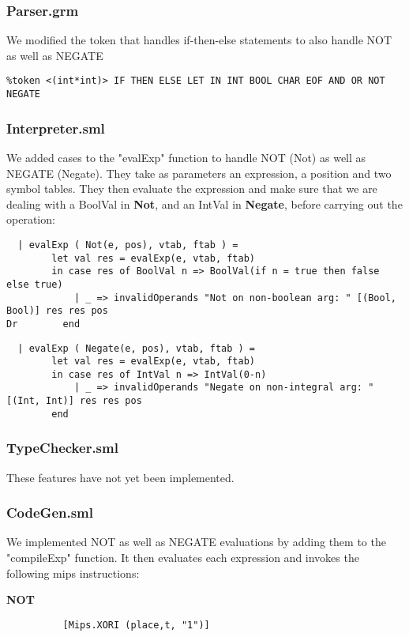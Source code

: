\documentclass[12pt]{article}
\begin{document}
\subsubsection{Parser.grm}
We modified the token that handles if-then-else statements to also handle NOT as well as NEGATE
\begin{verbatim}
%token <(int*int)> IF THEN ELSE LET IN INT BOOL CHAR EOF AND OR NOT NEGATE
\end{verbatim}
\subsubsection{Interpreter.sml}
We added cases to the "evalExp" function to handle NOT (Not) as well as NEGATE (Negate). They take as parameters an expression, a position and two symbol tables. They then evaluate the expression and make sure that we are dealing with a BoolVal in \textbf{Not}, and an IntVal in \textbf{Negate}, before carrying out the operation:

\begin{verbatim}
  | evalExp ( Not(e, pos), vtab, ftab ) =
        let val res = evalExp(e, vtab, ftab)
        in case res of BoolVal n => BoolVal(if n = true then false else true)
            | _ => invalidOperands "Not on non-boolean arg: " [(Bool, Bool)] res res pos
Dr        end
\end{verbatim}
\clearpage
\begin{verbatim}
  | evalExp ( Negate(e, pos), vtab, ftab ) =
        let val res = evalExp(e, vtab, ftab)
        in case res of IntVal n => IntVal(0-n)
            | _ => invalidOperands "Negate on non-integral arg: " [(Int, Int)] res res pos
        end
\end{verbatim}
\subsubsection{TypeChecker.sml}
These features have not yet been implemented.
\subsubsection{CodeGen.sml}
We implemented NOT as well as NEGATE evaluations by adding them to the "compileExp" function. It then evaluates each expression and invokes the following mips instructions:

\textbf{NOT}
\begin{verbatim}
          [Mips.XORI (place,t, "1")]
\end{verbatim}
\end{document}
